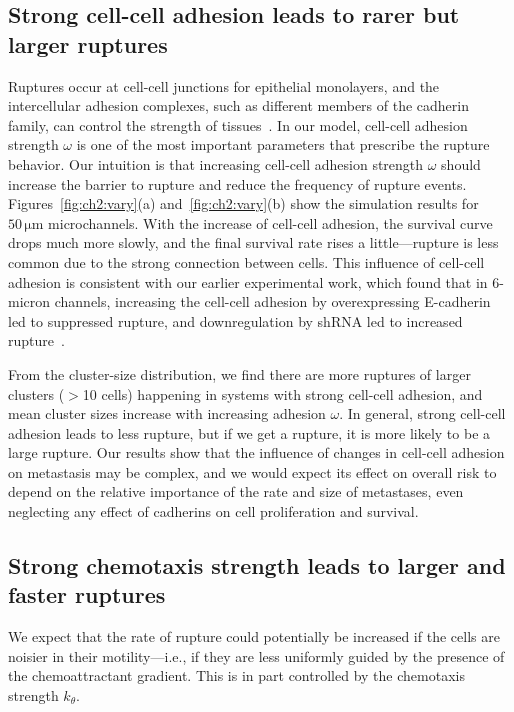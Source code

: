 \subsection{Strong cell-cell adhesion leads to rarer but larger ruptures}


Ruptures occur at cell-cell junctions for epithelial monolayers, and the intercellular adhesion complexes, such as different members of the cadherin family, can control the strength of tissues~\cite{duque2024rupture}.
In our model, cell-cell adhesion strength $\omega$ is one of the most important parameters that prescribe the rupture behavior.
Our intuition is that increasing cell-cell adhesion strength $\omega$ should increase the barrier to rupture and reduce the frequency of rupture events.
Figures~\ref{fig:ch2:vary}(a) and~\ref{fig:ch2:vary}(b) show the simulation results for $50\,\mathrm{\mu m}$ microchannels.
With the increase of cell-cell adhesion, the survival curve drops much more slowly, and the final survival rate rises a little---rupture is less common due to the strong connection between cells.
This influence of cell-cell adhesion is consistent with our earlier experimental work, which found that in 6-micron channels, increasing the cell-cell adhesion by overexpressing E-cadherin led to suppressed rupture, and downregulation by shRNA led to increased rupture~\cite{law2023cytokinesis}.

From the cluster-size distribution, we find there are more ruptures of larger clusters ($>$10 cells) happening in systems with strong cell-cell adhesion, and mean cluster sizes increase with increasing adhesion $\omega$.
In general, strong cell-cell adhesion leads to less rupture, but if we get a rupture, it is more likely to be a large rupture.
Our results show that the influence of changes in cell-cell adhesion on metastasis may be complex, and we would expect its effect on overall risk to depend on the relative importance of the rate and size of metastases, even neglecting any effect of cadherins on cell proliferation and survival.


\subsection{Strong chemotaxis strength leads to larger and faster ruptures}

We expect that the rate of rupture could potentially be increased if the cells are noisier in their motility---i.e., if they are less uniformly guided by the presence of the chemoattractant gradient.
This is in part controlled by the chemotaxis strength $k_\theta$.

